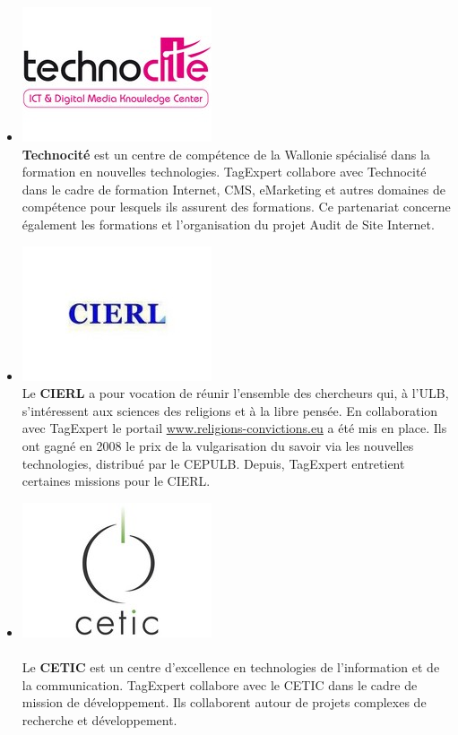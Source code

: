 \documentclass{article}
\begin{document}
\begin{sffamily}
\begin{itemize}
\item[] \includegraphics[scale=0.35]{technocite.jpg}\\
\textbf{Technocité} est un centre de compétence de la Wallonie spécialisé dans la formation en nouvelles technologies. TagExpert collabore avec Technocité dans le cadre de 
formation Internet, CMS, eMarketing et autres domaines de compétence pour lesquels ils assurent des formations. Ce partenariat concerne également les formations et 
l'organisation du projet Audit de Site Internet. 

\item[] \includegraphics[scale=0.35]{cierl.jpg}\\
Le \textbf{CIERL} a pour vocation de réunir l’ensemble des chercheurs qui, à l’ULB, s’intéressent aux sciences des religions et à la libre pensée. En collaboration avec 
TagExpert le portail \url{www.religions-convictions.eu} a été mis en place. Ils ont gagné en 2008 le prix de la vulgarisation du savoir via les nouvelles technologies, 
distribué par le CEPULB. Depuis, TagExpert entretient certaines missions pour le CIERL. \\

\item[] \includegraphics[scale=0.35]{cetic.jpg}\\$ $\\
Le \textbf{CETIC} est un centre d’excellence en technologies de l’information et de la communication. TagExpert collabore avec le CETIC dans le cadre de mission de 
développement. Ils collaborent autour de projets complexes de recherche et développement.


\end{itemize}
\end{sffamily}
\end{document}
